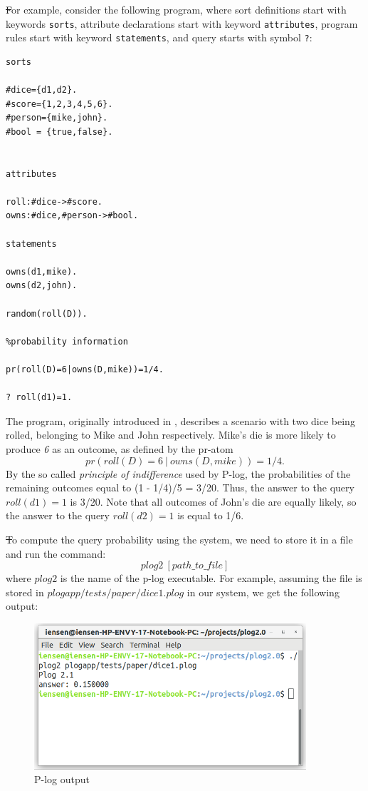 \documentclass[12pt, letterpaper]{article}
\begin{document}
\st
For example, consider the following program, where sort definitions start with keywords \texttt{sorts}, attribute declarations start with keyword \texttt{attributes}, program rules start with keyword \texttt{statements}, and query starts with symbol \texttt{?}:
\begin{verbatim}
sorts

#dice={d1,d2}.
#score={1,2,3,4,5,6}.
#person={mike,john}.
#bool = {true,false}.


attributes

roll:#dice->#score.
owns:#dice,#person->#bool.

statements

owns(d1,mike).
owns(d2,john).

random(roll(D)).

%probability information

pr(roll(D)=6|owns(D,mike))=1/4.

? roll(d1)=1.
\end{verbatim}


The program, originally introduced in \cite{gelfond2014knowledge}, describes a scenario with two dice being rolled, belonging to Mike and John respectively.
Mike's die is more likely to produce \textit{6} as an outcome, as defined by the pr-atom
$$pr(roll(D)=6~|~owns(D,mike))=1/4.$$
By the so called \textit{principle of indifference} used by P-log, the probabilities of the remaining outcomes equal to (1 - 1/4)/5 = 3/20.
Thus, the answer to the query $roll(d1)=1$ is 3/20. Note that all outcomes of John's die are equally likely, so the answer to the query $roll(d2)=1$ is equal to 1/6.


\st
To compute the query probability using the system, we need to store it in a file and run the command:
$$plog2~[path\_to\_file]$$
where $plog2$ is the name of the p-log executable. For example, assuming the file is stored in $plogapp/tests/paper/dice1.plog$ in our system, we get the following output:

\begin{figure}[ht]
\centering
\includegraphics[width=0.9\textwidth]{plog_output.png}
\caption{P-log output}
\label{fig:plog_output}
\end{figure}
\end{document}
